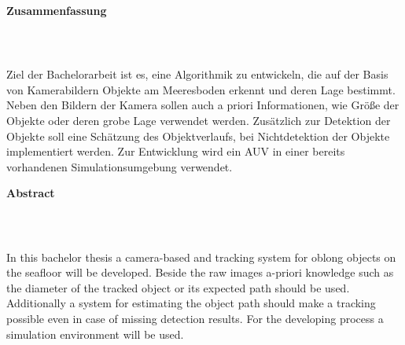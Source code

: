 \begin{verbatim}

\end{verbatim}
\begin{LARGE}\textbf{Zusammenfassung}\end{LARGE}\\
\begin{verbatim}

\end{verbatim}
Ziel der Bachelorarbeit ist es, eine Algorithmik zu entwickeln, die auf der Basis von Kamerabildern
Objekte am Meeresboden erkennt und deren Lage bestimmt. Neben den Bildern der Kamera sollen
auch a priori Informationen, wie Größe der Objekte oder deren grobe Lage verwendet werden.
Zusätzlich zur Detektion der Objekte soll eine Schätzung des Objektverlaufs, bei Nichtdetektion der
Objekte implementiert werden.
Zur Entwicklung wird ein AUV in einer bereits vorhandenen Simulationsumgebung verwendet.

\vfill

\begin{LARGE}\textbf{Abstract}\end{LARGE}\\
\begin{verbatim}

\end{verbatim}
In this bachelor thesis a camera-based and tracking system for oblong objects on the seafloor will be developed. Beside the raw images a-priori knowledge such as the diameter of the tracked object or its expected path should be used.\\
Additionally a system for estimating the object path should make a tracking possible even in case of missing detection results.
For the developing process a simulation environment will be used.
\vfill